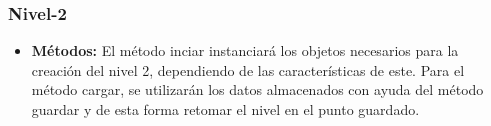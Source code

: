 \documentclass{article}
\begin{document}
    \subsubsection{Nivel-2}
    \begin{itemize}
        \item \textbf{Métodos:} El método inciar instanciará los objetos necesarios para la creación del nivel 2, dependiendo de las características de este. Para el método cargar, se utilizarán los datos almacenados con ayuda del método guardar y de esta forma retomar el nivel en el punto guardado.
    \end{itemize}
\end{document}
